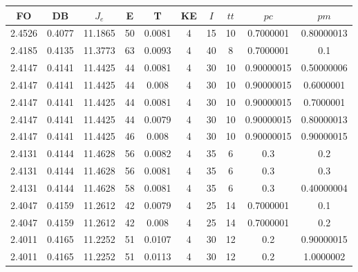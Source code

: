 \begin{table}[h!]
    \footnotesize
    \begin{center}
        \begin{tabular}{|c|c|c|c|c|c|c|c|c|c|}
        \hline
            {\bf FO} & {\bf DB} & $J_e$ & {\bf E} & {\bf T} & {\bf KE} & $I$ & $tt$ & $pc$ & $pm$ \\
        \hline
        \hline
            2.4526 & 0.4077  & 11.1865 & 50 & 0.0081 & 4 & 15 & 10 & 0.7000001 & 0.80000013\\
        \hline
        \hline
            2.4185 & 0.4135  & 11.3773 & 63 & 0.0093 & 4 & 40 & 8 & 0.7000001 & 0.1\\
        \hline
        \hline
            2.4147 & 0.4141  & 11.4425 & 44 & 0.0081 & 4 & 30 & 10 & 0.90000015 & 0.50000006\\
        \hline
        \hline
            2.4147 & 0.4141  & 11.4425 & 44 & 0.008 & 4 & 30 & 10 & 0.90000015 & 0.6000001\\
        \hline
        \hline
            2.4147 & 0.4141  & 11.4425 & 44 & 0.0081 & 4 & 30 & 10 & 0.90000015 & 0.7000001\\
        \hline
        \hline
            2.4147 & 0.4141  & 11.4425 & 44 & 0.0079 & 4 & 30 & 10 & 0.90000015 & 0.80000013\\
        \hline
        \hline
            2.4147 & 0.4141  & 11.4425 & 46 & 0.008 & 4 & 30 & 10 & 0.90000015 & 0.90000015\\
        \hline
        \hline
            2.4131 & 0.4144  & 11.4628 & 56 & 0.0082 & 4 & 35 & 6 & 0.3 & 0.2\\
        \hline
        \hline
            2.4131 & 0.4144  & 11.4628 & 56 & 0.0081 & 4 & 35 & 6 & 0.3 & 0.3\\
        \hline
        \hline
            2.4131 & 0.4144  & 11.4628 & 58 & 0.0081 & 4 & 35 & 6 & 0.3 & 0.40000004\\
        \hline
        \hline
            2.4047 & 0.4159  & 11.2612 & 42 & 0.0079 & 4 & 25 & 14 & 0.7000001 & 0.1\\
        \hline
        \hline
            2.4047 & 0.4159  & 11.2612 & 42 & 0.008 & 4 & 25 & 14 & 0.7000001 & 0.2\\
        \hline
        \hline
            2.4011 & 0.4165  & 11.2252 & 51 & 0.0107 & 4 & 30 & 12 & 0.2 & 0.90000015\\
        \hline
        \hline
            2.4011 & 0.4165  & 11.2252 & 51 & 0.0113 & 4 & 30 & 12 & 0.2 & 1.0000002\\

\end{tabular}
\end{center}
\end{table}
